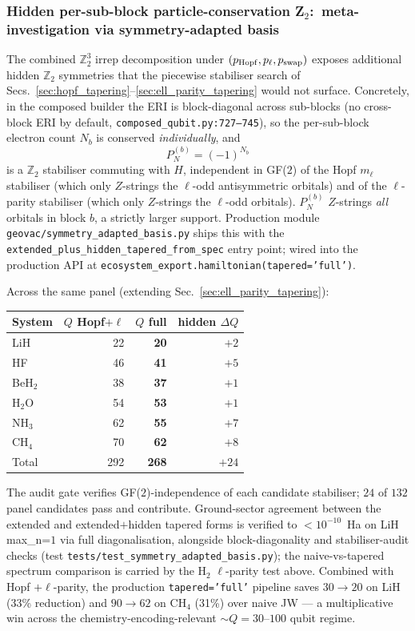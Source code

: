 \documentclass[aps,pra,twocolumn,superscriptaddress,longbibliography]{revtex4-2}
\begin{document}
\subsubsection{Hidden per-sub-block particle-conservation Z$_2$:\
meta-investigation via symmetry-adapted basis}
\label{sec:hidden_particle_z2}

The combined $\mathbb{Z}_2^3$ irrep decomposition under
$(p_{\rm Hopf}, p_\ell, p_{\rm swap})$ exposes additional hidden
$\mathbb{Z}_2$ symmetries that the piecewise stabiliser search of
Secs.~\ref{sec:hopf_tapering}--\ref{sec:ell_parity_tapering} would
not surface.  Concretely, in the composed builder the ERI is
block-diagonal across sub-blocks (no cross-block ERI by default,
\texttt{composed\_qubit.py:727--745}), so the per-sub-block electron
count $N_b$ is conserved \emph{individually}, and
\begin{equation}
  P_N^{(b)} = (-1)^{N_b}
\label{eq:per_block_particle_z2}
\end{equation}
is a $\mathbb{Z}_2$ stabiliser commuting with $H$, independent in
GF($2$) of the Hopf $m_\ell$ stabiliser (which only $Z$-strings the
$\ell$-odd antisymmetric orbitals) and of the $\ell$-parity
stabiliser (which only $Z$-strings the $\ell$-odd orbitals).
$P_N^{(b)}$ $Z$-strings \emph{all} orbitals in block $b$, a
strictly larger support.  Production module
\texttt{geovac/symmetry\_adapted\_basis.py} ships this with the
\texttt{extended\_plus\_hidden\_tapered\_from\_spec} entry point;
wired into the production API at
\texttt{ecosystem\_export.hamiltonian(tapered='full')}.

Across the same panel (extending Sec.~\ref{sec:ell_parity_tapering}):
\begin{center}
\begin{tabular}{lrrr}
System & $Q$ Hopf$+\ell$ & $Q$ full & hidden $\Delta Q$ \\
\hline
LiH    & 22 & \textbf{20} & $+2$ \\
HF     & 46 & \textbf{41} & $+5$ \\
BeH$_2$  & 38 & \textbf{37} & $+1$ \\
H$_2$O   & 54 & \textbf{53} & $+1$ \\
NH$_3$   & 62 & \textbf{55} & $+7$ \\
CH$_4$   & 70 & \textbf{62} & $+8$ \\
\hline
Total  & 292 & \textbf{268} & $+24$ \\
\end{tabular}
\end{center}
The audit gate verifies GF($2$)-independence of each candidate
stabiliser; $24$ of $132$ panel candidates pass and contribute.
Ground-sector agreement between the extended and extended$+$hidden
tapered forms is verified to $<10^{-10}$~Ha on LiH max\_n=$1$ via full
diagonalisation, alongside block-diagonality and stabiliser-audit
checks (test \texttt{tests/test\_symmetry\_adapted\_basis.py}); the
naive-vs-tapered spectrum comparison is carried by the H$_2$
$\ell$-parity test above.  Combined with
Hopf $+ \ell$-parity, the production
\texttt{tapered='full'} pipeline saves $30 \to 20$ on LiH (33\%
reduction) and $90 \to 62$ on CH$_4$ (31\%) over naive JW --- a
multiplicative win across the chemistry-encoding-relevant
$\sim Q=30$--$100$ qubit regime.
\end{document}
